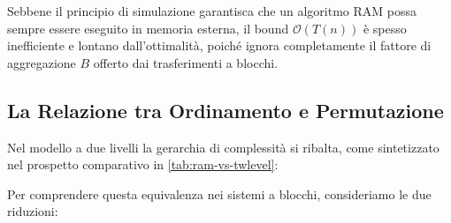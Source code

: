 Sebbene il principio di simulazione garantisca che un algoritmo RAM possa sempre essere eseguito in memoria esterna, il bound $\mathcal{O}(T(n))$ è spesso inefficiente e lontano dall'ottimalità, poiché ignora completamente il fattore di aggregazione $B$ offerto dai trasferimenti a blocchi.

\subsection{La Relazione tra Ordinamento e Permutazione}
\label{subsec:relationship-sort-perm}

Nel modello a due livelli la gerarchia di complessità si ribalta, come sintetizzato nel prospetto comparativo in \autoref{tab:ram-vs-twlevel}:

\begin{table}[H]
  \centering
  \renewcommand{\arraystretch}{1.5}
  \caption{Confronto di complessità asintotica tra RAM e Memoria Esterna.}
  \label{tab:ram-vs-twlevel}
\end{table}

Per comprendere questa equivalenza nei sistemi a blocchi, consideriamo le due riduzioni:

